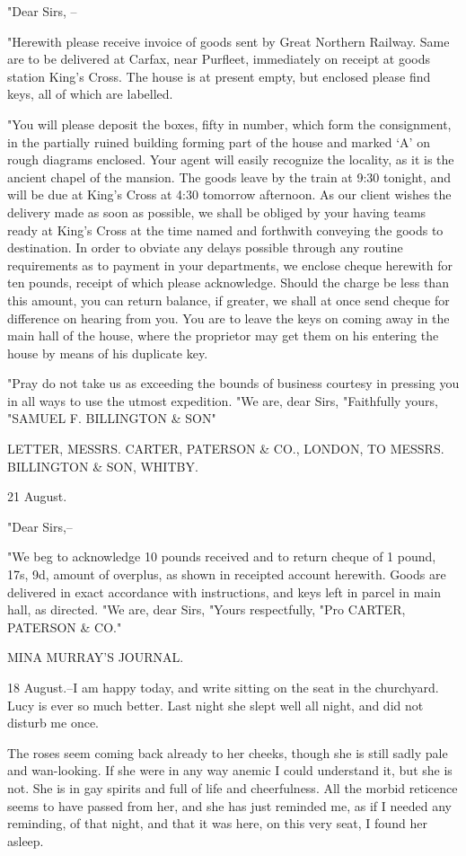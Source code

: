 "Dear Sirs, -- 

"Herewith please receive invoice of goods sent by Great Northern Railway. Same are to be delivered at Carfax, near Purfleet, immediately on receipt at goods station King's Cross. The house is at present empty, but enclosed please find keys, all of which are labelled. 

"You will please deposit the boxes, fifty in number, which form the consignment, in the partially ruined building forming part of the house and marked `A' on rough diagrams enclosed. Your agent will easily recognize the locality, as it is the ancient chapel of the mansion. The goods leave by the train at 9:30 tonight, and will be due at King's Cross at 4:30 tomorrow afternoon. As our client wishes the delivery made as soon as possible, we shall be obliged by your having teams ready at King's Cross at the time named and forthwith conveying the goods to destination. In order to obviate any delays possible through any routine requirements as to payment in your departments, we enclose cheque herewith for ten pounds, receipt of which please acknowledge. Should the charge be less than this amount, you can return balance, if greater, we shall at once send cheque for difference on hearing from you. You are to leave the keys on coming away in the main hall of the house, where the proprietor may get them on his entering the house by means of his duplicate key. 

"Pray do not take us as exceeding the bounds of business courtesy in pressing you in all ways to use the utmost expedition. "We are, dear Sirs, "Faithfully yours, "SAMUEL F. BILLINGTON & SON" 

LETTER, MESSRS. CARTER, PATERSON & CO., LONDON, TO MESSRS. BILLINGTON & SON, WHITBY. 

21 August. 

"Dear Sirs,-- 

"We beg to acknowledge 10 pounds received and to return cheque of 1 pound, 17s, 9d, amount of overplus, as shown in receipted account herewith. Goods are delivered in exact accordance with instructions, and keys left in parcel in main hall, as directed. "We are, dear Sirs, "Yours respectfully, "Pro CARTER, PATERSON & CO." 

MINA MURRAY'S JOURNAL. 

18 August.--I am happy today, and write sitting on the seat in the churchyard. Lucy is ever so much better. Last night she slept well all night, and did not disturb me once. 

The roses seem coming back already to her cheeks, though she is still sadly pale and wan-looking. If she were in any way anemic I could understand it, but she is not. She is in gay spirits and full of life and cheerfulness. All the morbid reticence seems to have passed from her, and she has just reminded me, as if I needed any reminding, of that night, and that it was here, on this very seat, I found her asleep. 

